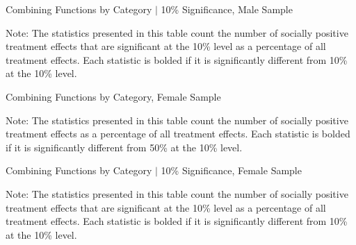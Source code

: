 	\begin{sidewaystable}[H]
	\begin{threeparttable}
     \caption{Combining Functions by Category $|$ 10\% Significance, Male Sample} 
     \label{table:abccare_rslt_male_counts_n10a10_all}
	
	\begin{tablenotes}
	\footnotesize
	\item Note: The statistics presented in this table count the number of socially positive treatment 
	effects that are significant at the 10\% level as a percentage of all treatment effects. Each statistic
	is bolded if it is significantly different from 10\% at the 10\% level.
	\end{tablenotes}
	\end{threeparttable}
	\end{sidewaystable}   

	\begin{sidewaystable}[H]
	\begin{threeparttable}
     \caption{Combining Functions by Category, Female Sample} 
     \label{table:abccare_rslt_female_counts_n50a100_all}
	
	\begin{tablenotes}
	\footnotesize
	\item Note: The statistics presented in this table count the number of socially positive treatment 
	 effects as a percentage of all treatment effects. Each statistic is bolded if it is significantly
	 different from 50\% at the 10\% level.
	\end{tablenotes}
	\end{threeparttable}
	\end{sidewaystable}   

	\begin{sidewaystable}[H]
	\begin{threeparttable}
     \caption{Combining Functions by Category $|$ 10\% Significance, Female Sample} 
     \label{table:abccare_rslt_female_counts_n10a10_all}
	
	\begin{tablenotes}
	\footnotesize
	\item Note: The statistics presented in this table count the number of socially positive treatment 
	effects that are significant at the 10\% level as a percentage of all treatment effects. Each statistic
	is bolded if it is significantly different from 10\% at the 10\% level.
	\end{tablenotes}
	\end{threeparttable}
	\end{sidewaystable}   